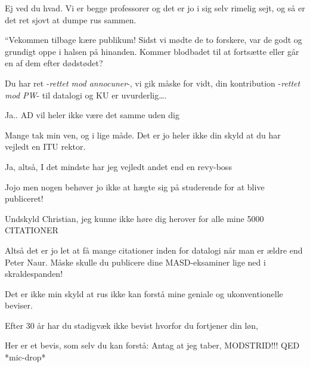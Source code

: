 \documentclass[a4paper,11pt]{article}
\begin{document}
\begin{sketch}

 Ej ved du hvad. Vi er begge professorer og det er jo i sig selv rimelig sejt, og så er det ret sjovt at dumpe rus sammen.



 “Vekommen tilbage kære publikum! Sidst vi mødte de to forskere, var de godt og grundigt oppe i halsen på hinanden.  Kommer blodbadet til at fortsætte eller går en af dem efter dødstødet?


 Du har ret -\textit{rettet mod annocuner}-, vi gik måske for vidt, din kontribution -\textit{rettet mod PW}- til datalogi og KU er uvurderlig…. 

 Ja.. AD vil heler ikke være det samme uden dig


 Mange tak min ven, og i lige måde. Det er jo heler ikke din skyld at du har vejledt en ITU rektor.

 Ja, altså, I det mindste har jeg vejledt andet end en revy-boss

 Jojo men nogen behøver jo ikke at hægte sig på studerende for at blive publiceret!


 Undskyld Christian, jeg kunne ikke høre dig herover for alle mine 5000 CITATIONER

 Altså det er jo let at få mange citationer inden for datalogi når man er ældre end Peter Naur. Måske skulle  du publicere dine MASD-eksaminer lige ned i skraldespanden!

 Det er ikke min skyld at rus ikke kan forstå mine geniale og ukonventionelle beviser.

 Efter 30 år har du stadigvæk ikke bevist hvorfor du fortjener din løn, 

 Her er et bevis, som selv du kan forstå: Antag at jeg taber, MODSTRID!!! QED *mic-drop*


\end{sketch}
\end{document}
